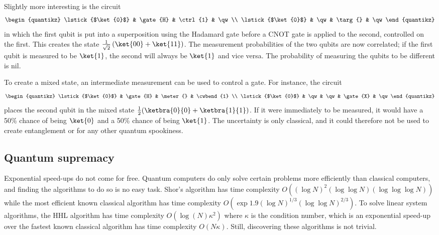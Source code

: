 Slightly more interesting is the circuit
\begin{equation}
    \begin{quantikz}
        \lstick{$\ket{0}$} & \gate{H} & \ctrl{1} & \qw \\
        \lstick{$\ket{0}$} & \qw & \targ{} & \qw
    \end{quantikz}
\end{equation}
in which the first qubit is put into a superposition using the Hadamard gate before a CNOT gate is applied to the second, controlled on the first.
This creates the state $\frac{1}{\sqrt{2}}\left(\ket{00} + \ket{11}\right)$.
The measurement probabilities of the two qubits are now correlated; if the first qubit is measured to be $\ket{1}$, the second will always be $\ket{1}$ and vice versa.
The probability of measuring the qubits to be different is nil.

To create a mixed state, an intermediate measurement can be used to control a gate.
For instance, the circuit
\begin{equation}
    \begin{quantikz}
        \lstick{$\ket{0}$} & \gate{H} & \meter{} & \cwbend{1} \\
        \lstick{$\ket{0}$} & \qw & \qw & \gate{X} & \qw
    \end{quantikz}
\end{equation}
places the second qubit in the mixed state $\frac{1}{2}(\ketbra{0}{0} + \ketbra{1}{1})$.
If it were immediately to be measured, it would have a 50\% chance of being $\ket{0}$ and a 50\% chance of being $\ket{1}$.
The uncertainty is only classical, and it could therefore not be used to create entanglement or for any other quantum spookiness.

\subsection{Quantum supremacy}
\begin{sloppypar}
    Exponential speed-ups do not come for free.
    Quantum computers do only solve certain problems more efficiently than classical computers, and finding the algorithms to do so is no easy task.
    \sloppy Shor's algorithm has time complexity $O((\log N)^2 (\log \log N) (\log \log \log N))$ while the most efficient known classical algorithm has time complexity $O(\exp{1.9(\log N)^{1/3} \text{} (\log \log N)^{2/3}})$.
    To solve linear system algorithms, the HHL algorithm has time complexity $O(\log(N)\kappa^2)$ where $\kappa$ is the condition number, which is an exponential speed-up over the fastest known classical algorithm has time complexity $O(N \kappa)$.
    Still, discovering these algorithms is not trivial.
\end{sloppypar}

